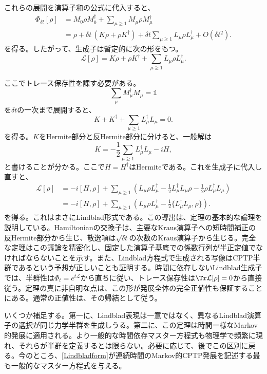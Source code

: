\documentclass[a4paper,11pt,oneside]{article}
\theoremstyle{definition}
\numberwithin{equation}{section}
\begin{document}
これらの展開を演算子和の公式に代入すると、
\begin{align}
\Phi_{\delta t}[\rho]
&=
M_0 \rho M_0^\dagger
+
\sum_{\mu\ge 1} M_\mu \rho M_\mu^\dagger
\nonumber\\
&=
\rho
+
\delta t\,(K\rho+\rho K^\dagger)
+
\delta t\sum_{\mu\ge 1} L_\mu \rho L_\mu^\dagger
+
O(\delta t^2) .
\end{align}
を得る。したがって、生成子は暫定的に次の形をもつ。
\begin{equation}
\mathcal L[\rho]
=
K\rho+\rho K^\dagger
+
\sum_{\mu\ge 1} L_\mu \rho L_\mu^\dagger .
\end{equation}


ここでトレース保存性を課す必要がある。
\begin{equation}
\sum_\mu M_\mu^\dagger M_\mu = \mathds{1} 
\end{equation}
を$\delta t$の一次まで展開すると、
\begin{equation}
K+K^\dagger+\sum_{\mu\ge 1} L_\mu^\dagger L_\mu = 0 .
\end{equation}
を得る。$K $をHermite部分と反Hermite部分に分けると、一般解は
\begin{equation}
K = -\frac12 \sum_{\mu\ge 1} L_\mu^\dagger L_\mu - iH ,
\end{equation}
と書けることが分かる。ここで$H=H^\dagger$はHermiteである。これを生成子に代入し直すと、
\begin{align}\label{LindbladS}
\mathcal L[\rho]
&=
-i[H,\rho]
+
\sum_{\mu\ge 1}
\left(
L_\mu \rho L_\mu^\dagger
-\frac12 L_\mu^\dagger L_\mu \rho
-\frac12 \rho L_\mu^\dagger L_\mu
\right)
\nonumber\\
&=
-i[H,\rho]
+
\sum_{\mu\ge 1}
\left(
L_\mu \rho L_\mu^\dagger
-\frac12 \{L_\mu^\dagger L_\mu,\rho\}
\right) .
\end{align}
を得る。これはまさにLindblad形式である。この導出は、定理の基本的な論理を説明している。Hamiltonianの交換子は、主要なKraus演算子への短時間補正の反Hermite部分から生じ、散逸項は$\sqrt{\delta t}$の次数のKraus演算子から生じる。完全な定理はこの議論を精密化し、固定した演算子基底での係数行列が半正定値でなければならないことを示す。また、Lindblad方程式で生成される写像はCPTP半群であるという予想が正しいことも証明する。時間に依存しないLindblad生成子では、半群性は$\Phi_t=e^{t\mathcal L}$から直ちに従い、トレース保存性は$\Tr \mathcal L[\rho]=0$から直接従う。定理の真に非自明な点は、この形が発展全体の完全正値性も保証することにある。通常の正値性は、その帰結として従う。



いくつか補足する。第一に、Lindblad表現は一意ではなく、異なるLindblad演算子の選択が同じ力学半群を生成しうる。第二に、この定理は時間一様なMarkov的発展に適用される。より一般的な時間依存マスター方程式も物理学で頻繁に現れ、それらが半群を定義するとは限らない。必要に応じて、後でこの区別に戻る。今のところ、\eqref{Lindbladform}が連続時間のMarkov的CPTP発展を記述する最も一般的なマスター方程式を与える。\\
\end{document}
